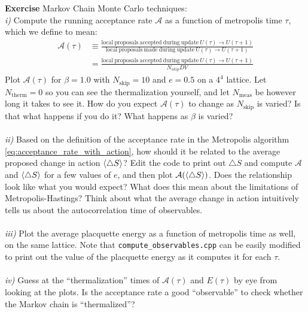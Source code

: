 \documentclass[11pt]{article}
\newcounter{exerciseno}
\DeclareRobustCommand{\exCnt}{\refstepcounter{exerciseno}\theexerciseno}
\begin{document}
\begin{tcolorbox}\textbf{Exercise \exCnt} Markov Chain Monte Carlo techniques:\\
\emph{i)} Compute the running acceptance rate $\mathcal A$ as a function of metropolis time $\tau$, which we define to mean:
\begin{align*}\mathcal A(\tau)&\equiv\frac{\mathrm{local\ proposals\ accepted\ during\ update\ }U(\tau)\to U(\tau+1)}{\mathrm{local\ proposals\ made\ during\ update\ }U(\tau)\to U(\tau+1)}\\&=\frac{\mathrm{local\ proposals\ accepted\ during\ update\ }U(\tau)\to U(\tau+1)}{N_{skip}DV}\end{align*}
Plot $\mathcal A(\tau)$ for $\beta=1.0$ with $N_{\mathrm{skip}}=10$ and $e=0.5$ on a $4^4$ lattice. Let $N_{\mathrm{therm}}=0$ so you can see the thermalization yourself, and let $N_{\mathrm{meas}}$ be however long it takes to see it. How do you expect $\mathcal A(\tau)$ to change as $N_{\mathrm{skip}}$ is varied? Is that what happens if you do it? What happens as $\beta$ is varied?\\\\
\emph{ii)} Based on the definition of the acceptance rate in the Metropolis algorithm \eqref{eq:acceptance_rate_with_action}, how should it be related to the average proposed change in action $\braket{\triangle S}$? Edit the code to print out $\triangle S$ and compute $\mathcal A$ and $\braket{\triangle S}$ for a few values of $e$, and then plot $\mathcal A(\braket{\triangle S})$. Does the relationship look like what you would expect? What does this mean about the limitations of Metropolis-Hastings? Think about what the average change in action intuitively tells us about the autocorrelation time of observables. \\\\
\emph{iii)} Plot the average placquette energy as a function of metropolis time as well, on the same lattice. Note that \lstinline{compute_observables.cpp} can be easily modified to print out the value of the placquette energy as it computes it for each $\tau$. \\\\
\emph{iv)} Guess at the ``thermalization'' times of $\mathcal A(\tau)$ and $E(\tau)$ by eye from looking at the plots. Is the acceptance rate a good ``observable'' to check whether the Markov chain is ``thermalized''? 
\end{tcolorbox}
\end{document}
